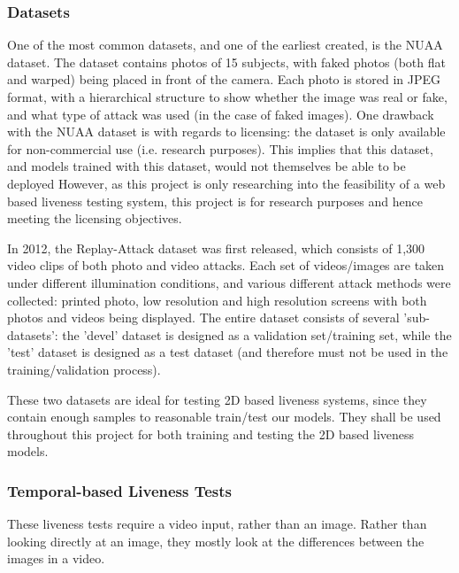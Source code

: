 \documentclass[10pt,a4paper]{article}
\begin{document}
        \subsubsection{Datasets}
        One of the most common datasets, and one of the earliest created, is the NUAA dataset.
        The dataset contains photos of 15 subjects, with faked photos (both flat and warped) being placed in front of the camera.
        Each photo is stored in JPEG format, with a hierarchical structure to show whether the image was real or fake, and what type of
        attack was used (in the case of faked images). One drawback with the NUAA dataset is with regards to licensing: the dataset is only available for
        non-commercial use (i.e. research purposes). This implies that this dataset, and models trained with this dataset, would not themselves be able to be deployed
        \cite{NUAADataset}
        However, as this project is only researching into the feasibility of a web based liveness testing system, this project is for research purposes and hence meeting the
        licensing objectives.

        In 2012, the Replay-Attack dataset was first released, which consists of 1,300 video clips of both photo and video attacks. Each
        set of videos/images are taken under different illumination conditions, and various different attack methods were collected: printed photo, low resolution and high resolution screens with both photos and 
        videos being displayed. The entire dataset consists of several 'sub-datasets': the 'devel' dataset is designed as a validation set/training set, while
        the 'test' dataset is designed as a test dataset (and therefore must not be used in the training/validation process). \cite{ReplayAttackDataset}

        These two datasets are ideal for testing 2D based liveness systems, since they contain enough samples to reasonable train/test our models. They shall be used
        throughout this project for both training and testing the 2D based liveness models.

        \subsubsection{Temporal-based Liveness Tests}
        These liveness tests require a video input, rather than an image. Rather than looking directly at an image, they mostly look at the differences between the images in a video.
        
\end{document}
